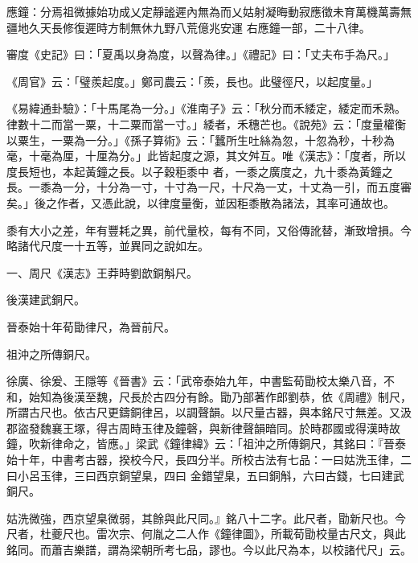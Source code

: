 \begin{pinyinscope}
 應鐘：分焉祖微據始功成乂定靜謐遲內無為而乂姑射凝晦動寂應徵未育萬機萬壽無疆地久天長修復遲時方制無休九野八荒億兆安運
 右應鐘一部，二十八律。



 審度《史記》曰：「夏禹以身為度，以聲為律。」《禮記》曰：「丈夫布手為尺。」



 《周官》云：「璧羨起度。」鄭司農云：「羨，長也。此璧徑尺，以起度量。」



 《易緯通卦驗》：「十馬尾為一分。」《淮南子》云：「秋分而禾緌定，緌定而禾熟。律數十二而當一粟，十二粟而當一寸。」緌者，禾穗芒也。《說苑》云：「度量權衡以粟生，一粟為一分。」《孫子算術》云：「蠶所生吐絲為忽，十忽為秒，十秒為毫，十毫為厘，十厘為分。」此皆起度之源，其文舛互。唯《漢志》：「度者，所以度長短也，本起黃鐘之長。以子穀秬黍中
 者，一黍之廣度之，九十黍為黃鐘之長。一黍為一分，十分為一寸，十寸為一尺，十尺為一丈，十丈為一引，而五度審矣。」後之作者，又憑此說，以律度量衡，並因秬黍散為諸法，其率可通故也。



 黍有大小之差，年有豐耗之異，前代量校，每有不同，又俗傳訛替，漸致增損。今略諸代尺度一十五等，並異同之說如左。



 一、周尺《漢志》王莽時劉歆銅斛尺。



 後漢建武銅尺。



 晉泰始十年荀勖律尺，為晉前尺。



 祖沖之所傳銅尺。



 徐廣、徐爰、王隱等《晉書》云：「武帝泰始九年，中書監荀勖校太樂八音，不和，始知為後漢至魏，尺長於古四分有餘。勖乃部著作郎劉恭，依《周禮》制尺，所謂古尺也。依古尺更鑄銅律呂，以調聲韻。以尺量古器，與本銘尺寸無差。又汲郡盜發魏襄王塚，得古周時玉律及鐘磬，與新律聲韻暗同。於時郡國或得漢時故鐘，吹新律命之，皆應。」梁武《鐘律緯》云：「祖沖之所傳銅尺，其銘曰：『晉泰始十年，中書考古器，揆校今尺，長四分半。所校古法有七品：一曰姑洗玉律，二曰小呂玉律，三曰西京銅望臬，四曰
 金錯望臬，五曰銅斛，六曰古錢，七曰建武銅尺。



 姑洗微強，西京望臬微弱，其餘與此尺同。』銘八十二字。此尺者，勖新尺也。今尺者，杜夔尺也。雷次宗、何胤之二人作《鐘律圖》，所載荀勖校量古尺文，與此銘同。而蕭吉樂譜，謂為梁朝所考七品，謬也。今以此尺為本，以校諸代尺」云。




\end{pinyinscope}
